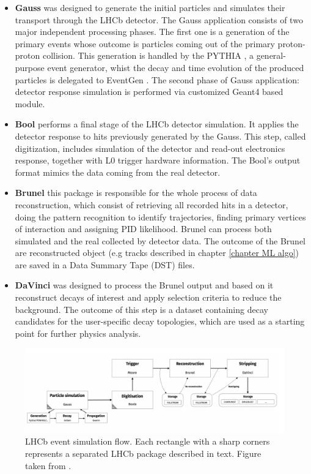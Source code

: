 \begin{itemize}
    \item \textbf{Gauss} \cite{lhcb_software} was designed to generate the initial particles and simulates their transport through the LHCb detector. The Gauss application consists of two major independent processing phases. The first one is a generation of the primary events whose outcome is particles coming out of the primary proton-proton collision. This generation is handled by the PYTHIA \cite{pythia}, a general-purpose event generator, whist the decay and time evolution of the produced particles is delegated to EventGen \cite{EventGen}. The second phase of Gauss application: detector response simulation is performed via customized Geant4 \cite{geant4} based module. 
    \item \textbf{Bool} \cite{lhcb_software}  performs a final stage of the LHCb detector simulation. It applies the detector response to hits previously generated by the Gauss. This step, called digitization, includes simulation of the detector and read-out electronics response, together with  L0 trigger hardware information. The Bool's output format mimics the data coming from the real detector.
    \item \textbf{Brunel} \cite{lhcb_software} this package is responsible for the whole process of data reconstruction, which consist of retrieving all recorded hits in a detector, doing the pattern recognition to identify trajectories, finding primary vertices of interaction and assigning PID likelihood. Brunel can process both simulated and the real collected by detector data. The outcome of the Brunel are reconstructed object (e.g tracks described in chapter \ref{chapter ML algo}) are saved in a Data Summary Tape (DST) files.   
    \item  \textbf{DaVinci} \cite{lhcb_software} was designed to process the Brunel output and based on it reconstruct decays of interest and apply selection criteria to reduce the background. The outcome of this step is a dataset containing decay candidates for the user-specific decay topologies, which are used as a starting point for further physics analysis.   
    
\end{itemize}


\begin{figure}[!h]
\centering
\includegraphics[width=\linewidth]{figures/LHCb_simulation.PNG}
\caption{LHCb event simulation flow. Each rectangle with a sharp corners represents a separated LHCb package described in text. Figure taken from  \cite{lhcb_computing}.
\label{fig:lhcb_sim}}
\end{figure}



